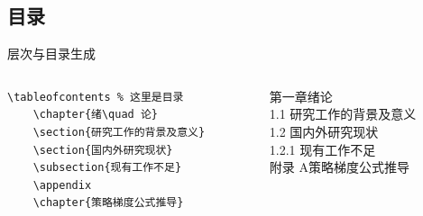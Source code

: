 \subsection{目录}
\begin{frame}[fragile]{层次与目录生成}
    \begin{columns}
        \begin{column}{.6\textwidth}
            \lstset{language=[LaTeX]TeX}
            \begin{lstlisting}[basicstyle=\ttfamily\small]
    \tableofcontents % 这里是目录
    \chapter{绪\quad 论}
    \section{研究工作的背景及意义}
    \section{国内外研究现状}
    \subsection{现有工作不足}
    \appendix
    \chapter{策略梯度公式推导}\end{lstlisting}
        \end{column}
        \begin{column}{.4\textwidth}
            \heiti
            {\centering 第一章\quad 绪\quad 论 \\}
            1.1 研究工作的背景及意义 \\
            1.2 国内外研究现状 \\
            1.2.1 现有工作不足 \\
            {\centering 附录 A\quad 策略梯度公式推导\\}
        \end{column}
    \end{columns}

\end{frame}

